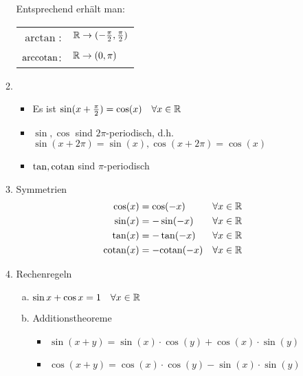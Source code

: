 \documentclass[10pt, a4paper, fleqn]{article}
\begin{document}
\begin{enumerate}[a), start=9]
\begin{enumerate}[1.]
            Entsprechend erhält man:

            \begin{tabular}{rl}
                $\arctan$: & $\mathbb{R} \to (-\frac{\pi}{2}, \frac{\pi}{2})$ \\
                $\text{arccotan}$: & $\mathbb{R} \to (0, \pi)$
            \end{tabular}

            \item
            \begin{itemize}
                \item Es ist $\sin(x + \frac{\pi}{2}) = \cos(x) \quad \forall x \in \mathbb{R}$
                \item $\sin, \cos$ sind $2\pi$-periodisch, d.h. \\
                $\sin(x + 2 \pi) = \sin(x), \cos(x + 2 \pi) = \cos(x)$
                \item $\tan, \text{cotan}$ sind $\pi$-periodisch
            \end{itemize}

            \item Symmetrien
            \[\begin{aligned}
                \cos(x) &= \cos(-x) & \forall x \in \mathbb{R} \\
                \sin(x) &= -\sin(-x) & \forall x \in \mathbb{R} \\
                \tan(x) &= -\tan(-x) &\forall x \in \mathbb{R} \\
                \text{cotan}(x) &= -\text{cotan}(-x) & \forall x \in \mathbb{R}
            \end{aligned}\]

            \item Rechenregeln
            \begin{enumerate}[a)]
                \item $\sin x + \cos x = 1 \quad \forall x \in \mathbb{R}$
                \item Additionstheoreme
                \begin{itemize}
                    \item $\sin(x+y) = \sin(x) \cdot \cos(y) + \cos(x) \cdot \sin(y)$
                    \item $\cos(x+y) = \cos(x) \cdot \cos(y) - \sin(x) \cdot \sin(y)$
                \end{itemize}
            \end{enumerate}
        \end{enumerate}
    \end{enumerate}
\end{document}
